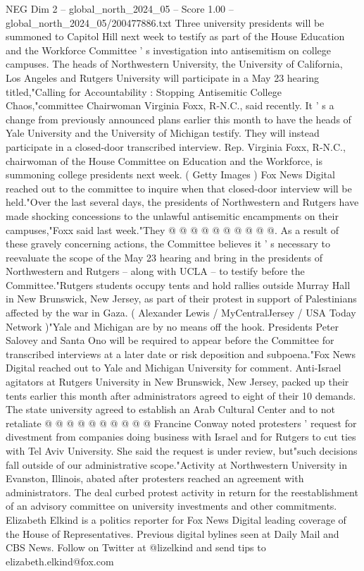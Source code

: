 \begin{textsample}{NEG Dim 2 – global\_north\_2024\_05 – Score 1.00 – global\_north\_2024\_05/200477886.txt}  \label{ex:f2_neg_151}
Three university presidents will be summoned to Capitol Hill next week to testify as part of the House Education and the Workforce Committee ' s investigation into antisemitism on college campuses.
The heads of Northwestern University, the University of California, Los Angeles and Rutgers University will participate in a May 23 hearing titled,"Calling for Accountability : Stopping Antisemitic College Chaos,"committee Chairwoman Virginia Foxx, R-N.C., said recently.
It ' s a change from previously announced plans earlier this month to have the heads of Yale University and the University of Michigan testify.
They will instead participate in a closed-door transcribed interview.
Rep.
Virginia Foxx, R-N.C., chairwoman of the House Committee on Education and the Workforce, is summoning college presidents next week. ( Getty Images ) Fox News Digital reached out to the committee to inquire when that closed-door interview will be held."Over the last several days, the presidents of Northwestern and Rutgers have made shocking concessions to the unlawful antisemitic encampments on their campuses,"Foxx said last week."They @ @ @ @ @ @ @ @ @ @.
As a result of these gravely concerning actions, the Committee believes it ' s necessary to reevaluate the scope of the May 23 hearing and bring in the presidents of Northwestern and Rutgers -- along with UCLA -- to testify before the Committee."Rutgers students occupy tents and hold rallies outside Murray Hall in New Brunswick, New Jersey, as part of their protest in support of Palestinians affected by the war in Gaza. ( Alexander Lewis / MyCentralJersey / USA Today Network )"Yale and Michigan are by no means off the hook.
Presidents Peter Salovey and Santa Ono will be required to appear before the Committee for transcribed interviews at a later date or risk deposition and subpoena."Fox News Digital reached out to Yale and Michigan University for comment.
Anti-Israel agitators at Rutgers University in New Brunswick, New Jersey, packed up their tents earlier this month after administrators agreed to eight of their 10 demands.
The state university agreed to establish an Arab Cultural Center and to not retaliate @ @ @ @ @ @ @ @ @ @ Francine Conway noted protesters ' request for divestment from companies doing business with Israel and for Rutgers to cut ties with Tel Aviv University.
She said the request is under review, but"such decisions fall outside of our administrative scope."Activity at Northwestern University in Evanston, Illinois, abated after protesters reached an agreement with administrators.
The deal curbed protest activity in return for the reestablishment of an advisory committee on university investments and other commitments.
Elizabeth Elkind is a politics reporter for Fox News Digital leading coverage of the House of Representatives.
Previous digital bylines seen at Daily Mail and CBS News.
Follow on Twitter at @lizelkind and send tips to elizabeth.elkind@fox.com

\end{textsample}
